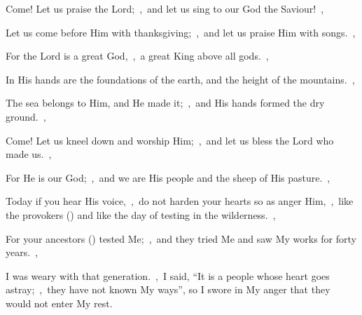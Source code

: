 \documentclass[12pt,twoside,a5paper]{article}
\begin{document}
\begin{halfparskip}
   Come! Let us praise the Lord;~\sep\ and let us sing to our God the Saviour!~\sep

  Let us come before Him with thanksgiving;~\sep\ and let us praise Him with songs.~\sep

  For the Lord is a great God,~\sep\ a great King above all gods.~\sep

  In His hands are the foundations of the earth, and the height of the mountains.~\sep

  The sea belongs to Him, and He made it;~\sep\ and His hands formed the dry ground.~\sep

  Come! Let us kneel down and worship Him;~\sep\ and let us bless the Lord who made us.~\sep

  For He is our God;~\sep\ and we are His people and the sheep of His pasture.~\sep

  Today if you hear His voice,~\sep\ do not harden your hearts so as anger Him,~\sep\ like the provokers () and like the day of testing in the wilderness.~\sep

  For your ancestors () tested Me;~\sep\ and they tried Me and saw My works for forty years.~\sep

  I was weary with that generation.~\sep\ I said, ``It is a people whose heart goes astray;~\sep\ they have not known My ways'', so I swore in My anger that they would not enter My rest.
\end{halfparskip}

\end{document}
